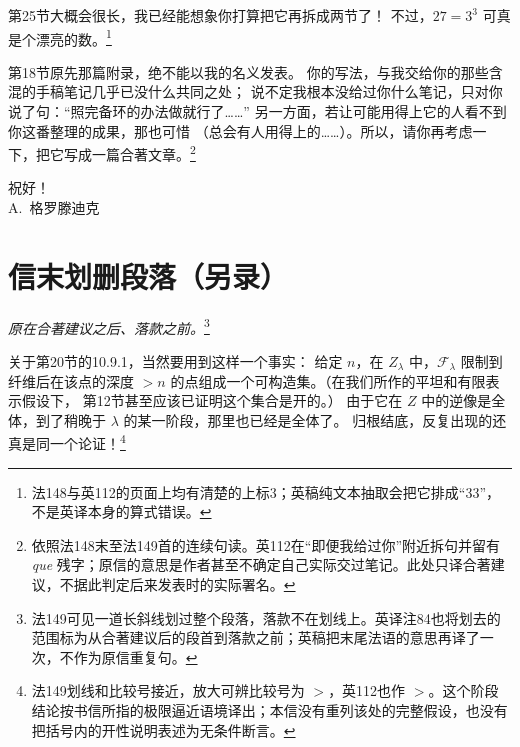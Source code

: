 \documentclass[openany,fontset=fandol]{ctexbook}
\newcommand{\FF}{\mathcal F}
\begin{document}
\begin{samepage}
第25节大概会很长，我已经能想象你打算把它再拆成两节了！
不过，\(27=3^3\) 可真是个漂亮的数。\footnote{法148与英112的页面上均有清楚的上标\(3\)；英稿纯文本抽取会把它排成“33”，不是英译本身的算式错误。}
\par\end{samepage}

第18节原先那篇附录，绝不能以我的名义发表。
你的写法，与我交给你的那些含混的手稿笔记几乎已没什么共同之处；
说不定我根本没给过你什么笔记，只对你说了句：“照完备环的办法做就行了……”
另一方面，若让可能用得上它的人看不到你这番整理的成果，那也可惜
（总会有人用得上的……）。所以，请你再考虑一下，把它写成一篇合著文章。\footnote{依照法148末至法149首的连续句读。英112在“即便我给过你”附近拆句并留有 \emph{que} 残字；原信的意思是作者甚至不确定自己实际交过笔记。此处只译合著建议，不据此判定后来发表时的实际署名。}

\begin{flushright}
祝好！\\[3pt]
A.~格罗滕迪克
\end{flushright}

\section*{信末划删段落（另录）}
\noindent\emph{原在合著建议之后、落款之前。}\footnote{法149可见一道长斜线划过整个段落，落款不在划线上。英译注84也将划去的范围标为从合著建议后的段首到落款之前；英稿把末尾法语的意思再译了一次，不作为原信重复句。}

关于第20节的10.9.1，当然要用到这样一个事实：
给定 \(n\)，在 \(Z_\lambda\) 中，\(\FF_\lambda\) 限制到纤维后在该点的深度
\(>n\) 的点组成一个可构造集。（在我们所作的平坦和有限表示假设下，
第12节甚至应该已证明这个集合是开的。）
由于它在 \(Z\) 中的逆像是全体，到了稍晚于 \(\lambda\) 的某一阶段，那里也已经是全体了。
归根结底，反复出现的还真是同一个论证！\footnote{法149划线和比较号接近，放大可辨比较号为 \(>\)，英112也作 \(>\)。这个阶段结论按书信所指的极限逼近语境译出；本信没有重列该处的完整假设，也没有把括号内的开性说明表述为无条件断言。}
\end{document}
